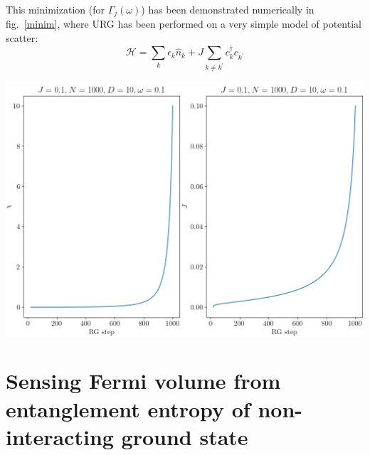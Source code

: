 \documentclass[12pt,twoside]{article}
\numberwithin{equation}{section}
\begin{document}
{\pb This minimization (for \(\Gamma_j(\omega)\)) has been demonstrated numerically in fig.~\ref{minim}, where URG has been performed on a very simple model of potential scatter:
\begin{equation}
	\mathcal{H} = \sum_k \epsilon_k \hat n_k + J \sum_{k \neq k^\prime} c^\dagger_k c_{k^\prime}
\end{equation}
\begin{center}
	\includegraphics[scale=0.6]{../figures/pot_scatt_dbrack.png}
	\label{minim}
\end{center}
\section{Sensing Fermi volume from entanglement entropy of non-interacting ground state}
}
\end{document}
